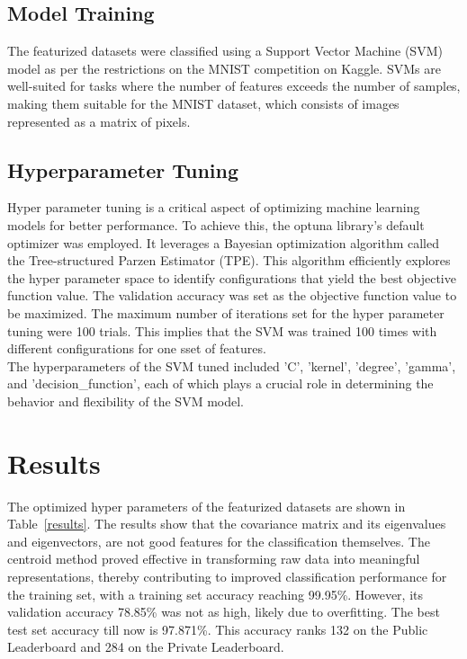 \documentclass{article}
\begin{document}
\subsection{Model Training}
The featurized datasets were classified using a Support Vector Machine (SVM) model as per the restrictions on the MNIST competition on Kaggle. SVMs are well-suited for tasks where the number of features exceeds the number of samples, making them suitable for the MNIST dataset, which consists of images represented as a matrix of pixels.

\subsection{Hyperparameter Tuning}
Hyper parameter tuning is a critical aspect of optimizing machine learning models for better performance. To achieve this, the optuna library's default optimizer was employed. It leverages a Bayesian optimization algorithm called the Tree-structured Parzen Estimator (TPE). This algorithm efficiently explores the hyper parameter space to identify configurations that yield the best objective function value. The validation accuracy was set as the objective function value to be maximized. The maximum number of iterations set for the hyper parameter tuning were 100 trials. This implies that the SVM was trained 100 times with different configurations for one sset of features. 
\\
The hyperparameters of the SVM tuned included 'C', 'kernel', 'degree', 'gamma', and 'decision\_function', each of which plays a crucial role in determining the behavior and flexibility of the SVM model.

\section{Results}

The optimized hyper parameters of the featurized datasets are shown in Table~\ref{results}. The results show that the covariance matrix and its eigenvalues and eigenvectors, are not good features for the classification themselves. The centroid method proved effective in transforming raw data into meaningful representations, thereby contributing to improved classification performance for the training set, with a training set accuracy reaching 99.95\%. However, its validation accuracy 78.85\% was not as high, likely due to overfitting. The best test set accuracy till now is 97.871\%. This accuracy ranks 132 on the Public Leaderboard and 284 on the Private Leaderboard.
\end{document}
